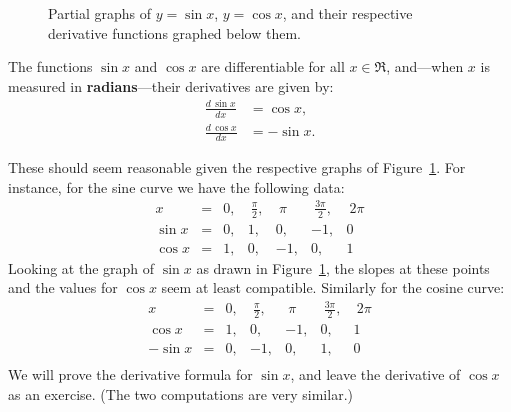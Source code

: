 \begin{figure}
\begin{center}
\bigskip

\end{center}
\caption{Partial graphs of $y=\sin x$, $y=\cos x$, and
their respective derivative functions graphed below them.}
\label{SineAndCosineAndDerivativesFigure}\end{figure}


\begin{theorem} The functions $\sin x$ and $\cos x$ are
differentiable for all $x\in\Re$, and---when $x$
is measured in {\bf radians}---their derivatives
are given by:
\begin{align}
\frac{d\,\sin x}{dx}&=\cos x,\label{SineDerivative}\\
\frac{d\,\cos x}{dx}&=-\sin x.\label{CosineDerivative}
\end{align}\end{theorem}

These should seem reasonable given the respective graphs of
Figure~\ref{SineAndCosineAndDerivativesFigure}.
For instance, for the sine curve we have the following data:
$$
\begin{array}{rcrrrrr}
x&=&0,&\ \frac{\pi}2,&\ \pi&\ \frac{3\pi}2,&\ 2\pi\\
\sin x&=&0,&1,&0,&-1,&0\\
\cos x&=&1,&0,&-1,&0,&1\end{array}$$
Looking at the graph of $\sin x$ as drawn in
Figure~\ref{SineAndCosineAndDerivativesFigure},
the slopes at these points and the values for $\cos x$
seem at least compatible.  Similarly for the cosine
curve:
$$
\begin{array}{rcrrrrr}
x&=&0,&\ \frac{\pi}2,&\ \pi&\ \frac{3\pi}2,&\ 2\pi\\
\cos x&=&1,&0,&-1,&0,&1\\
-\sin x&=&0,&-1,&0,&1,&0\\\end{array}$$
We will prove the derivative formula for $\sin x$, and leave
the derivative of $\cos x$ as an exercise.  (The two 
computations are very similar.)

